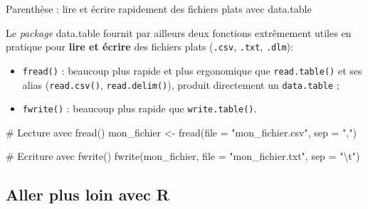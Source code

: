 \documentclass[12pt,ignorenonframetext,handout,]{beamer}
\newenvironment{Shaded}{}{}
\newcommand{\CharTok}[1]{\textcolor[rgb]{0.00,0.50,0.50}{#1}}
\newcommand{\CommentTok}[1]{\textcolor[rgb]{0.00,0.50,0.00}{#1}}
\newcommand{\DataTypeTok}[1]{#1}
\newcommand{\KeywordTok}[1]{\textcolor[rgb]{0.00,0.00,1.00}{#1}}
\newcommand{\NormalTok}[1]{#1}
\newcommand{\StringTok}[1]{\textcolor[rgb]{0.00,0.50,0.50}{#1}}
\providecommand{\tightlist}{%
  \setlength{\itemsep}{0pt}\setlength{\parskip}{0pt}}
\renewenvironment{Shaded}{\begin{snugshade}}{\end{snugshade}}
\newcommand{\intertitre}[1]{\textcolor{redInsee}{\textbf{#1}}}
\begin{document}
\begin{frame}[fragile]{Parenthèse : lire et écrire rapidement des
fichiers plats avec data.table}
\protect\hypertarget{parenthese-lire-et-ecrire-rapidement-des-fichiers-plats-avec-data.table}{}

Le \emph{package} data.table fournit par ailleurs deux fonctions
extrêmement utiles en pratique pour \intertitre{lire et écrire} des
fichiers plats (\texttt{.csv}, \texttt{.txt}, \texttt{.dlm}):

\begin{itemize}
\tightlist
\item
  \pause \texttt{fread()} : beaucoup plus rapide et plus ergonomique que
  \texttt{read.table()} et ses alias (\texttt{read.csv()},
  \texttt{read.delim()}), produit directement un \texttt{data.table} ;
\item
  \pause \texttt{fwrite()} : beaucoup plus rapide que
  \texttt{write.table()}.
\end{itemize}

\footnotesize \pause

\begin{Shaded}
\begin{Highlighting}[]
\CommentTok{# Lecture avec fread()}
\NormalTok{mon_fichier <-}\StringTok{ }\KeywordTok{fread}\NormalTok{(}\DataTypeTok{file =} \StringTok{"mon_fichier.csv"}\NormalTok{, }\DataTypeTok{sep =} \StringTok{","}\NormalTok{)}

\CommentTok{# Ecriture avec fwrite()}
\KeywordTok{fwrite}\NormalTok{(mon_fichier, }\DataTypeTok{file =} \StringTok{"mon_fichier.txt"}\NormalTok{, }\DataTypeTok{sep =} \StringTok{"}\CharTok{\textbackslash{}t}\StringTok{"}\NormalTok{)}
\end{Highlighting}
\end{Shaded}

\end{frame}

\hypertarget{aller-plus-loin-avec-r}{%
\subsection{Aller plus loin avec R}\label{aller-plus-loin-avec-r}}
\end{document}
